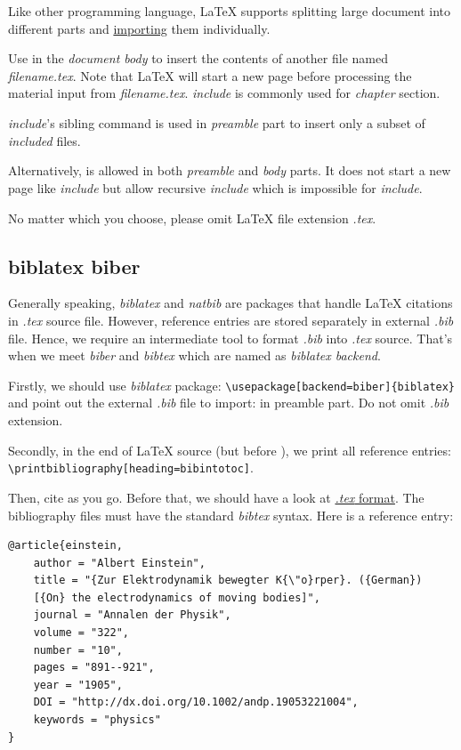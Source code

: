 Like other programming language, \LaTeX{} supports splitting large
document into different parts and
\href{https://tex.stackexchange.com/a/250}{importing} them
individually.

Use \verb|| in the \textit{document body} to
insert the contents of another file named
\textit{filename.tex}. Note that \LaTeX{} will start a new page
before processing the material input from
\textit{filename.tex}. \textit{include} is commonly used for
\textit{chapter} section.

\textit{include}'s sibling command
\verb|| is used in
\textit{preamble} part to insert only a subset of
\textit{included} files.

Alternatively, \verb|| is allowed in both
\textit{preamble} and \textit{body} parts. It does not start a new
page like \textit{include} but allow recursive \textit{include}
which is impossible for \textit{include}.

No matter which you choose, please omit \LaTeX{} file extension
\textit{.tex}.

\subsection{biblatex biber}
\label{sec:biblatex-biber}

Generally speaking, \textit{biblatex} and \textit{natbib} are
packages that handle \LaTeX{} citations in \textit{.tex} source
file. However, reference entries are stored separately in external
\textit{.bib} file. Hence, we require an intermediate tool to
format \textit{.bib} into \textit{.tex} source. That's when we
meet \textit{biber} and \textit{bibtex} which are named as
\textit{biblatex backend}.

Firstly, we should use \textit{biblatex} package:
\verb|\usepackage[backend=biber]{biblatex}|
and point out the external \textit{.bib} file to import:
\verb|| in preamble part. Do not omit
\textit{.bib} extension.

Secondly, in the end of \LaTeX{} source (but before
\verb||), we print all reference entries:
\verb|\printbibliography[heading=bibintotoc]|.

Then, cite as you go. Before that, we should have a look at
\href{https://www.sharelatex.com/learn/Bibliography_management_in_LaTeX#The_bibliography_file}{\textit{.tex}
format}. The bibliography files must have the standard
\textit{bibtex} syntax. Here is a reference entry:
\begin{center}
\begin{lstlisting}[caption={BibTeX entry sample}]
@article{einstein,
    author = "Albert Einstein",
    title = "{Zur Elektrodynamik bewegter K{\"o}rper}. ({German})
    [{On} the electrodynamics of moving bodies]",
    journal = "Annalen der Physik",
    volume = "322",
    number = "10",
    pages = "891--921",
    year = "1905",
    DOI = "http://dx.doi.org/10.1002/andp.19053221004",
    keywords = "physics"
}
\end{lstlisting}
\end{center}

